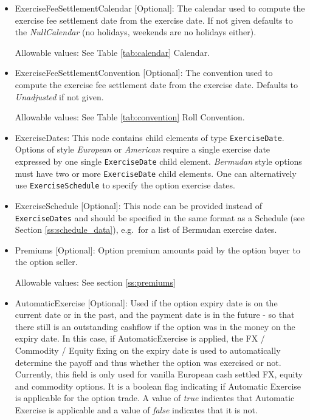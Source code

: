 \begin{itemize}
\item ExerciseFeeSettlementCalendar [Optional]: The calendar used to compute the exercise fee settlement date from the
  exercise date. If not given defaults to the  \emph{NullCalendar} (no holidays, weekends are no holidays either).
  
  Allowable values: See Table \ref{tab:calendar} Calendar.

\item ExerciseFeeSettlementConvention [Optional]: The convention used to compute the exercise fee settlement date from
  the exercise date. Defaults to \emph{Unadjusted} if not given.
  
  Allowable values: See Table \ref{tab:convention} Roll Convention.

\item ExerciseDates: This node contains child elements of type
  \lstinline!ExerciseDate!. Options of style \emph{European} or
  \emph{American} require a single exercise date expressed by one
  single \lstinline!ExerciseDate! child element.  \emph{Bermudan}
  style options must have two or more \lstinline!ExerciseDate! child
  elements. One can alternatively use \lstinline!ExerciseSchedule! to
  specify the option exercise dates.

\item ExerciseSchedule [Optional]: This node can be provided instead of \lstinline!ExerciseDates! and
should be specified in the same format as a Schedule (see Section \ref{ss:schedule_data}), e.g.\ for
a list of Bermudan exercise dates.

\item Premiums [Optional]: Option premium amounts paid by the option buyer to the option seller.

Allowable values:  See section \ref{ss:premiums}

\item AutomaticExercise [Optional]: Used if the option expiry date is on the current date or in the past, and the payment date is in the future  - so that there still is an outstanding cashflow if the option was in the money on the expiry date. In this case, if AutomaticExercise is applied, the FX / Commodity / Equity fixing on the expiry date is used to automatically determine the payoff and thus whether the option was exercised or not.\\
\medskip
Currently, this field is only used for vanilla European cash settled FX, equity and commodity options. It is a boolean flag indicating if Automatic Exercise is applicable for the option trade. A value of \emph{true} indicates that Automatic Exercise is applicable and a value of \emph{false} indicates that it is not.


\end{itemize}
